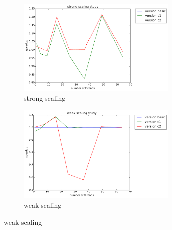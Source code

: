 \documentclass[12pt]{article}
\numberwithin{equation}{section}
\begin{document}
\begin{figure}[!ht]
   \begin{subfigure}
      \centering
        \begin{center}
      \includegraphics[width=0.85\textwidth] {plots/c_strong_ivdep+simd+flags}
        \end{center}
      \label{aload0}
      \caption{strong scaling}
  \end{subfigure}
  \begin{subfigure}
      \centering
        \begin{center}
      \includegraphics[width=0.85\textwidth] {plots/c_weak_ivdep+simd+flags}
        \end{center}
      \label{aload1}
      \caption{weak scaling}
  \end{subfigure}
\end{figure}
\end{document}
